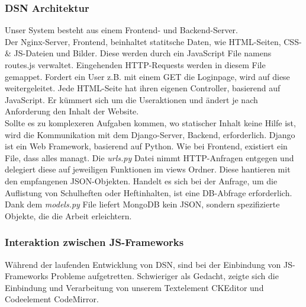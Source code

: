 
\subsubsection{DSN Architektur}
Unser System besteht aus einem Frontend- und Backend-Server.\\
Der Nginx-Server, Frontend, beinhaltet statitsche Daten, wie HTML-Seiten, CSS- \& JS-Dateien und Bilder. Diese werden durch ein JavaScript File namens routes.js verwaltet. Eingehenden HTTP-Requests werden in diesem File gemappet. Fordert ein User z.B. mit einem GET die Loginpage, wird auf diese weitergeleitet. Jede HTML-Seite hat ihren eigenen Controller, basierend auf JavaScript. Er kümmert sich um die Useraktionen und ändert je nach Anforderung den Inhalt der Website.\\
Sollte es zu komplexeren Aufgaben kommen, wo statischer Inhalt keine Hilfe ist, wird die Kommunikation mit dem Django-Server, Backend, erforderlich. Django ist ein Web Framework, basierend auf Python. Wie bei Frontend, existiert ein File, dass alles managt. Die \textit{urls.py} Datei nimmt HTTP-Anfragen entgegen und delegiert diese auf jeweiligen Funktionen im views Ordner. Diese hantieren mit den empfangenen JSON-Objekten. Handelt es sich bei der Anfrage, um die Auflistung von Schulheften oder Heftinhalten, ist eine DB-Abfrage erforderlich.\\
Dank dem \textit{models.py} File liefert MongoDB kein JSON, sondern spezifizierte Objekte, die die Arbeit erleichtern.

\subsubsection{Interaktion zwischen JS-Frameworks}
Während der laufenden Entwicklung von DSN, sind bei der Einbindung von JS-Frameworks Probleme aufgetretten. Schwieriger als Gedacht, zeigte sich die Einbindung und Verarbeitung von unserem Textelement CKEditor und Codeelement CodeMirror.\\

